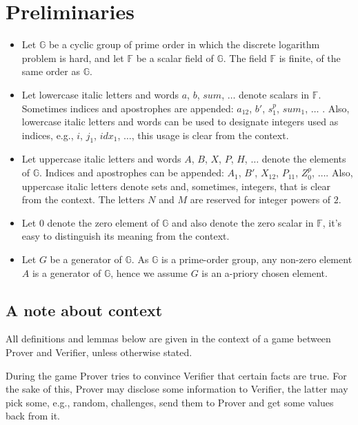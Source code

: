 \documentclass{mathcryptology} %
\theoremstyle{title}
\theoremstyle{titleof}
\begin{document}
\section{Preliminaries}
    \begin{itemize}
        \item Let $\mathds{G}$ be a cyclic group of prime order in which the discrete logarithm problem is hard, and let $\mathds{F}$ be a scalar field of $\mathds{G}$. The field $\mathds{F}$ is finite, of the same order as $\mathds{G}$.
        \item Let lowercase italic letters and words $a$, $b$, ${sum}$, $\dots$ denote scalars in $\mathds{F}$. Sometimes indices and apostrophes are appended: $a_{12}$, $b'$, $s_{1}^{p}$, ${sum}_{1}$, $\dots$ . Also, lowercase italic letters and words can be used to designate integers used as indices, e.g., $i$, $j_{1}$, ${idx}_{1}$, $\dots$, this usage is clear from the context.
        \item Let uppercase italic letters and words $A$, $B$, $X$, $P$, $H$, ${\dots}$ denote the elements of $\mathds{G}$. Indices and apostrophes can be appended: $A_{1}$, $B'$, $X_{12}$, $P_{11}$, $Z_{0}^{p}$, ${\dots}$. Also, uppercase italic letters denote sets and, sometimes, integers, that is clear from the context. The letters $N$ and $M$ are reserved for integer powers of $2$.
        \item Let $0$ denote the zero element of $\mathds{G}$ and also denote the zero scalar in $\mathds{F}$, it's easy to distinguish its meaning from the context.
        \item Let $G$ be a generator of $\mathds{G}$. As $\mathds{G}$ is a prime-order group, any non-zero element $A$ is a generator of $\mathds{G}$, hence we assume $G$ is an a-priory chosen element.
    \end{itemize}


\subsection{A note about context}
    All definitions and lemmas below are given in the context of a game between Prover and Verifier, unless otherwise stated.

    During the game Prover tries to convince Verifier that certain facts are true. For the sake of this, Prover may disclose some information to Verifier, the latter may pick some, e.g., random, challenges, send them to Prover and get some values back from it.
\end{document}
